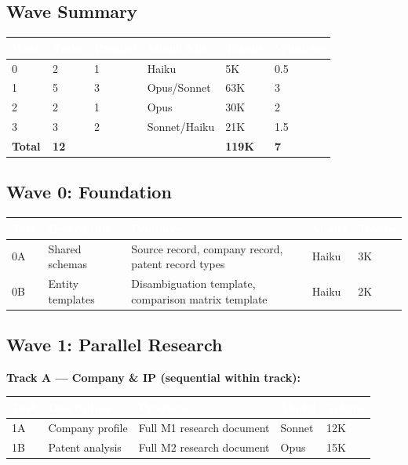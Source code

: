\documentclass[11pt,letterpaper]{article}
\newcommand{\tableheader}[1]{\textbf{\sffamily\textcolor{white}{#1}}}
\begin{document}
\subsection{Wave Summary}

\begin{center}
\begin{tabularx}{\textwidth}{C{1cm}C{1cm}C{2cm}C{2cm}C{2cm}C{2cm}}
\toprule
{}
\tableheader{Wave} & \tableheader{Tasks} & \tableheader{Parallel} & \tableheader{Model Mix} & \tableheader{Tokens} & \tableheader{Windows} \\
 & 2 & 1 & Haiku & 5K & 0.5 \\
1 & 5 & 3 & Opus/Sonnet & 63K & 3 \\
2 & 2 & 1 & Opus & 30K & 2 \\
3 & 3 & 2 & Sonnet/Haiku & 21K & 1.5 \\
\textbf{Total} & \textbf{12} & & & \textbf{119K} & \textbf{7} \\
\bottomrule
\end{tabularx}
\end{center}

\subsection{Wave 0: Foundation}

\begin{center}
\begin{tabularx}{\textwidth}{C{0.8cm}L{3cm}XC{1.3cm}C{1.3cm}}
\toprule
{}
\tableheader{Task} & \tableheader{Description} & \tableheader{Produces} & \tableheader{Model} & \tableheader{Tokens} \\
\midrule
0A & Shared schemas & Source record, company record, patent record types & Haiku & 3K \\
0B & Entity templates & Disambiguation template, comparison matrix template & Haiku & 2K \\
\bottomrule
\end{tabularx}
\end{center}

\subsection{Wave 1: Parallel Research}

\textbf{Track A --- Company \& IP (sequential within track):}

\begin{center}
\begin{tabularx}{\textwidth}{C{0.8cm}L{3cm}XC{1.3cm}C{1.3cm}}
\toprule
{}
\tableheader{Task} & \tableheader{Description} & \tableheader{Produces} & \tableheader{Model} & \tableheader{Tokens} \\
\midrule
1A & Company profile & Full M1 research document & Sonnet & 12K \\
1B & Patent analysis & Full M2 research document & Opus & 15K \\
\bottomrule
\end{tabularx}
\end{center}
\end{document}
